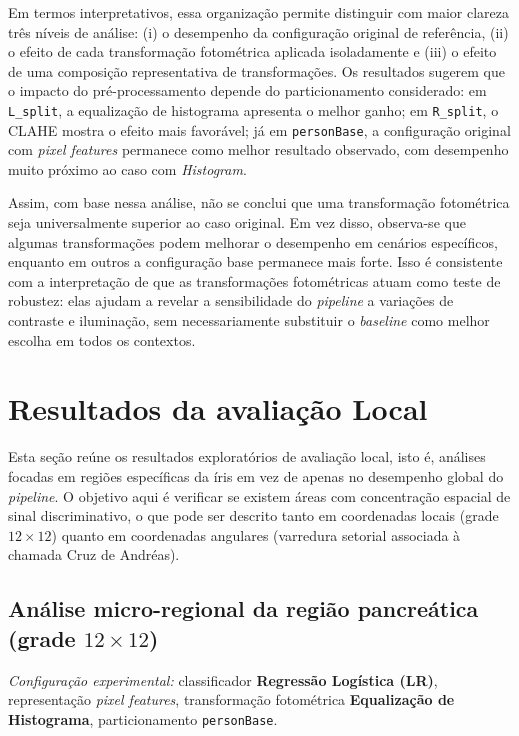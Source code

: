 \documentclass[11pt,a4paper]{article}
\begin{document}
Em termos interpretativos, essa organização permite distinguir com maior clareza três níveis de análise: (i) o desempenho da configuração original de referência, (ii) o efeito de cada transformação fotométrica aplicada isoladamente e (iii) o efeito de uma composição representativa de transformações. Os resultados sugerem que o impacto do pré-processamento depende do particionamento considerado: em \texttt{L\_split}, a equalização de histograma apresenta o melhor ganho; em \texttt{R\_split}, o CLAHE mostra o efeito mais favorável; já em \texttt{personBase}, a configuração original com \textit{pixel features} permanece como melhor resultado observado, com desempenho muito próximo ao caso com \textit{Histogram}.

Assim, com base nessa análise, não se conclui que uma transformação fotométrica seja universalmente superior ao caso original. Em vez disso, observa-se que algumas transformações podem melhorar o desempenho em cenários específicos, enquanto em outros a configuração base permanece mais forte. Isso é consistente com a interpretação de que as transformações fotométricas atuam como teste de robustez: elas ajudam a revelar a sensibilidade do \textit{pipeline} a variações de contraste e iluminação, sem necessariamente substituir o \textit{baseline} como melhor escolha em todos os contextos.

\section{Resultados da avaliação Local}
Esta seção reúne os resultados exploratórios de avaliação local, isto é, análises focadas em regiões específicas da íris em vez de apenas no desempenho global do \textit{pipeline}. O objetivo aqui é verificar se existem áreas com concentração espacial de sinal discriminativo, o que pode ser descrito tanto em coordenadas locais (grade \(12\times 12\)) quanto em coordenadas angulares (varredura setorial associada à chamada Cruz de Andréas).

\subsection{Análise micro-regional da região pancreática (grade \texorpdfstring{$12\times 12$}{12x12})}
\noindent\textit{Configuração experimental:} classificador \textbf{Regressão Logística (LR)}, representação \emph{pixel features}, transformação fotométrica \textbf{Equalização de Histograma}, particionamento \texttt{personBase}.
\end{document}
